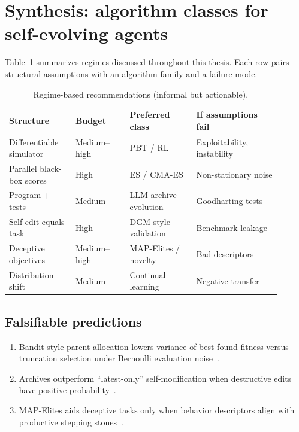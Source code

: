 \section{Synthesis: algorithm classes for self-evolving agents}
\label{sec:synth}

Table~\ref{tab:matrix} summarizes regimes discussed throughout this thesis.
Each row pairs structural assumptions with an algorithm family and a failure mode.

\begin{table}[t]
  \centering
  \caption{Regime-based recommendations (informal but actionable).}
  \label{tab:matrix}
  \small
  \begin{tabular}{p{0.22\linewidth}p{0.18\linewidth}p{0.22\linewidth}p{0.28\linewidth}}
    \hline
    Structure & Budget & Preferred class & If assumptions fail \\
    \hline
    Differentiable simulator & Medium--high & PBT / RL~\cite{jaderberg2017population} & Exploitability, instability \\
    Parallel black-box scores & High & ES / CMA-ES~\cite{hansen2001completely} & Non-stationary noise \\
    Program + tests & Medium & LLM archive evolution~\cite{lange2025shinka} & Goodharting tests \\
    Self-edit equals task & High & DGM-style validation~\cite{zhang2025darwin} & Benchmark leakage \\
    Deceptive objectives & Medium--high & MAP-Elites / novelty~\cite{mouret2015illuminating,lehman2011novelty} & Bad descriptors \\
    Distribution shift & Medium & Continual learning~\cite{zeno2024continual} & Negative transfer \\
    \hline
  \end{tabular}
\end{table}

\subsection{Falsifiable predictions}
\begin{enumerate}
  \item Bandit-style parent allocation lowers variance of best-found fitness versus truncation selection under Bernoulli evaluation noise~\cite{auer2002finite,lange2025shinka}.
  \item Archives outperform ``latest-only'' self-modification when destructive edits have positive probability~\cite{zhang2025darwin}.
  \item MAP-Elites aids deceptive tasks only when behavior descriptors align with productive stepping stones~\cite{mouret2015illuminating}.
\end{enumerate}
